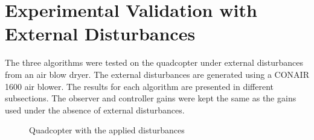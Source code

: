 \documentclass[letterpaper%
, twoside%
, 12pt%
,memoire%
, english%
,creativecommons,hyperref%
]{thETS}
\theoremstyle{newThmStyle}
\begin{document}
\section{Experimental Validation with External Disturbances}
The three algorithms were tested on the quadcopter under external disturbances from an air blow dryer. The external disturbances are generated using a CONAIR 1600 air blower. The results for each algorithm are presented in different subsections. The observer and controller gains were kept the same as the gains used under the absence of external disturbances.
\begin{figure}[H]
	\centering
	\parbox{0.75\textwidth}{\caption{{Quadcopter with the applied disturbances \label{Fig:dryer}}}}
\end{figure}
\end{document}
